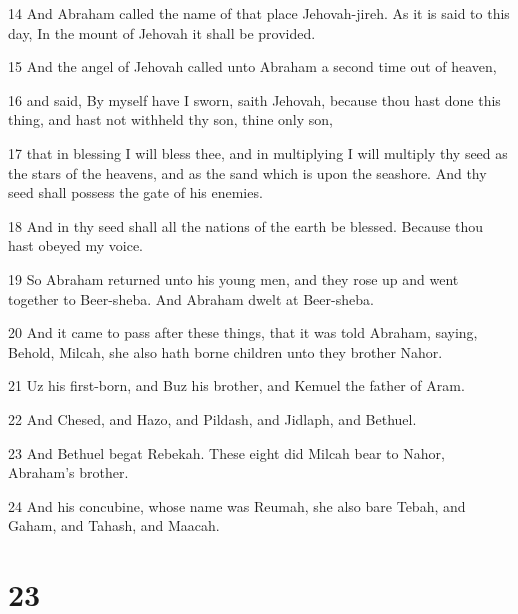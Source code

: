 \par 14 And Abraham called the name of that place Jehovah-jireh. As it is said to this day, In the mount of Jehovah it shall be provided.
\par 15 And the angel of Jehovah called unto Abraham a second time out of heaven,
\par 16 and said, By myself have I sworn, saith Jehovah, because thou hast done this thing, and hast not withheld thy son, thine only son,
\par 17 that in blessing I will bless thee, and in multiplying I will multiply thy seed as the stars of the heavens, and as the sand which is upon the seashore. And thy seed shall possess the gate of his enemies.
\par 18 And in thy seed shall all the nations of the earth be blessed. Because thou hast obeyed my voice.
\par 19 So Abraham returned unto his young men, and they rose up and went together to Beer-sheba. And Abraham dwelt at Beer-sheba.
\par 20 And it came to pass after these things, that it was told Abraham, saying, Behold, Milcah, she also hath borne children unto they brother Nahor.
\par 21 Uz his first-born, and Buz his brother, and Kemuel the father of Aram.
\par 22 And Chesed, and Hazo, and Pildash, and Jidlaph, and Bethuel.
\par 23 And Bethuel begat Rebekah. These eight did Milcah bear to Nahor, Abraham's brother.
\par 24 And his concubine, whose name was Reumah, she also bare Tebah, and Gaham, and Tahash, and Maacah.

\chapter{23}

